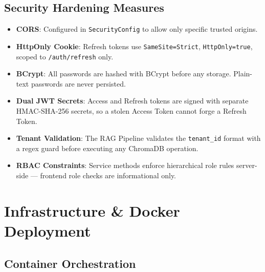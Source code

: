 \documentclass[12pt,a4paper]{report}
\begin{document}
\section{Security Hardening Measures}

\begin{itemize}
  \item \textbf{CORS}: Configured in \texttt{SecurityConfig} to allow only specific trusted origins.
  \item \textbf{HttpOnly Cookie}: Refresh tokens use \texttt{SameSite=Strict}, \texttt{HttpOnly=true}, scoped to \texttt{/auth/refresh} only.
  \item \textbf{BCrypt}: All passwords are hashed with BCrypt before any storage. Plain-text passwords are never persisted.
  \item \textbf{Dual JWT Secrets}: Access and Refresh tokens are signed with separate HMAC-SHA-256 secrets, so a stolen Access Token cannot forge a Refresh Token.
  \item \textbf{Tenant Validation}: The RAG Pipeline validates the \texttt{tenant\_id} format with a regex guard before executing any ChromaDB operation.
  \item \textbf{RBAC Constraints}: Service methods enforce hierarchical role rules server-side — frontend role checks are informational only.
\end{itemize}

\clearpage
\chapter{Infrastructure \& Docker Deployment}

\section{Container Orchestration}
\end{document}
